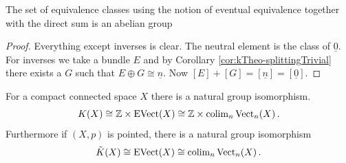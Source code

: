 \begin{lemma}
	The set of equivalence classes using the notion of eventual equivalence  together with the direct sum is an abelian group
\end{lemma}
\begin{proof}
	Everything except inverses is clear. The neutral element is the class of $\underline{0}$. For inverses we take a bundle $E$ and by Corollary \ref{cor:kTheo-splittingTrivial} there exists a $G$ such that $E\oplus G\cong\underline{n}$. Now $[E]+[G]=[\underline{n}]=[\underline{0}]$.
\end{proof}
\begin{lemma}\label{lem:kTheo-reducedKisEventually}
	For a compact connected space $X$ there is a natural group isomorphism.
	\begin{equation*}
		K(X) \cong \mathbb{Z}\times \mathrm{EVect}(X) \cong\mathbb{Z} \times \operatorname{\mathrm{colim}}_n \operatorname{\mathrm{Vect}}_n(X)\,.
	\end{equation*}
	Furthermore if $(X,p)$ is pointed, there is a natural group isomorphism 
	\begin{equation*}
		\tilde{K}(X)\cong \mathrm{EVect}(X) \cong \operatorname{\mathrm{colim}}_n \operatorname{\mathrm{Vect}}_n(X)\,.
	\end{equation*}
\end{lemma}
